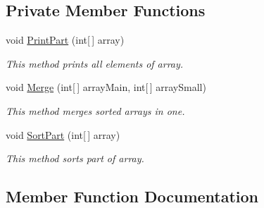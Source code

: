 \subsection*{Private Member Functions}
\begin{DoxyCompactItemize}
\item 
void \mbox{\hyperlink{class_home_work_1_1_task_library_1_1_tasks_1_1_experements_1_1_experement1_1_1_classes_1_1_my_own_algorithm_aa41c92e0b01a5e14ae9ad57fbd4f5bb8}{Print\+Part}} (int\mbox{[}$\,$\mbox{]} array)
\begin{DoxyCompactList}\small\item\em This method prints all elements of array. \end{DoxyCompactList}\item 
void \mbox{\hyperlink{class_home_work_1_1_task_library_1_1_tasks_1_1_experements_1_1_experement1_1_1_classes_1_1_my_own_algorithm_af9ed175c5aa37cc2d83ef4c4f9f98c68}{Merge}} (int\mbox{[}$\,$\mbox{]} array\+Main, int\mbox{[}$\,$\mbox{]} array\+Small)
\begin{DoxyCompactList}\small\item\em This method merges sorted arrays in one. \end{DoxyCompactList}\item 
void \mbox{\hyperlink{class_home_work_1_1_task_library_1_1_tasks_1_1_experements_1_1_experement1_1_1_classes_1_1_my_own_algorithm_a8987de71b80668651fd6bb516c294e1e}{Sort\+Part}} (int\mbox{[}$\,$\mbox{]} array)
\begin{DoxyCompactList}\small\item\em This method sorts part of array. \end{DoxyCompactList}\end{DoxyCompactItemize}


\subsection{Member Function Documentation}
\mbox{\label{class_home_work_1_1_task_library_1_1_tasks_1_1_experements_1_1_experement1_1_1_classes_1_1_my_own_algorithm_af9ed175c5aa37cc2d83ef4c4f9f98c68}} 
